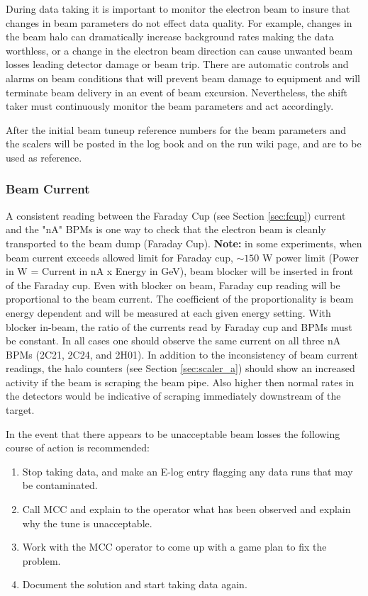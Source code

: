 \documentclass[12pt]{article}
\begin{document}
During data taking it is important to monitor the electron beam
to insure that changes in beam parameters do not effect data quality. For
example, changes in the beam halo can dramatically increase background rates
making the data worthless, or a change in the electron beam direction can cause
unwanted beam losses leading detector damage or beam trip. There are
automatic controls and alarms on beam conditions that will prevent beam damage to equipment 
and will terminate beam delivery in an event of beam excursion. Nevertheless,  the shift taker must
continuously monitor the beam parameters and act accordingly.

After the initial beam tuneup reference numbers for the beam parameters and the scalers will be posted
in the log book and on the run wiki page, and are to be used as reference. 

\subsubsection{Beam Current}
\indent

A consistent reading between the Faraday Cup (see Section \ref{sec:fcup}) current
and the "nA" BPMs is one way
to check that the electron beam is cleanly transported to the beam dump (Faraday Cup). {\bf Note:} in some experiments, when beam current exceeds allowed 
limit for Faraday cup, $\sim 150$ W power limit (Power in W = Current in nA x Energy in GeV), beam blocker will be inserted in front of the Faraday cup. Even with blocker on beam, Faraday cup reading will be proportional to the beam current. The coefficient of the proportionality is beam energy dependent and will be measured at each given energy setting. With blocker in-beam, the ratio of the currents read by Faraday cup and BPMs must be constant. In all cases one should observe the same current on all three nA BPMs (2C21, 2C24, and 2H01). In addition to the inconsistency of beam current readings, the halo counters (see Section \ref{sec:scaler_a}) should
show an increased activity if the beam is scraping the beam pipe. Also higher then normal rates in the detectors would be indicative
of scraping immediately downstream of the target.

In the event that there appears to be unacceptable beam losses the following course of action is recommended:

\begin{enumerate}
\item Stop taking data, and make an E-log entry flagging any data runs that may be
contaminated.
\item Call MCC and explain to the operator what has been observed and explain why
the tune is unacceptable.
\item Work with the MCC operator to come up with a game plan to fix the problem.
\item Document the solution and start taking data again.
\end{enumerate}
\end{document}

